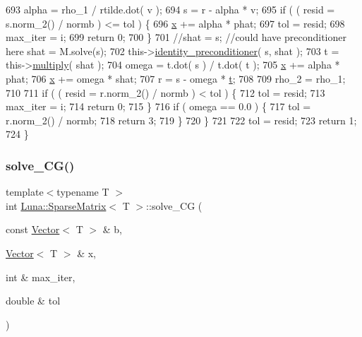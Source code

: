 \begin{DoxyCode}
693       alpha = rho\_1 / rtilde.dot( v );
694       s = r - alpha * v;
695       \textcolor{keywordflow}{if} ( ( resid = s.norm\_2() / normb ) <= tol ) \{
696         \hyperlink{namespaceHeat__plot_aa88370c16b85b784ccbde3ed88bc1991}{x} += alpha * phat;
697         tol = resid;
698         max\_iter = i;
699         \textcolor{keywordflow}{return} 0;
700       \}
701       \textcolor{comment}{//shat = s; //could have preconditioner here shat = M.solve(s);}
702       this->\hyperlink{classLuna_1_1SparseMatrix_ac196d00210b58f3f62352054f4241411}{identity\_preconditioner}( s, shat );
703       t = this->\hyperlink{classLuna_1_1SparseMatrix_a532c8a8b80b0accf950a642344e7954f}{multiply}( shat );
704       omega = t.dot( s ) / t.dot( t );
705       \hyperlink{namespaceHeat__plot_aa88370c16b85b784ccbde3ed88bc1991}{x} += alpha * phat;
706       \hyperlink{namespaceHeat__plot_aa88370c16b85b784ccbde3ed88bc1991}{x} += omega * shat;
707       r = s - omega * \hyperlink{namespaceHeat__plot_a25a93a2226128530145cc611f350163b}{t};
708 
709       rho\_2 = rho\_1;
710 
711       \textcolor{keywordflow}{if} ( ( resid = r.norm\_2() / normb ) < tol ) \{
712         tol = resid;
713         max\_iter = i;
714         \textcolor{keywordflow}{return} 0;
715       \}
716       \textcolor{keywordflow}{if} ( omega == 0.0 ) \{
717         tol = r.norm\_2() / normb;
718         \textcolor{keywordflow}{return} 3;
719       \}
720     \}
721 
722     tol = resid;
723     \textcolor{keywordflow}{return} 1;
724   \}
\end{DoxyCode}
\mbox{\label{classLuna_1_1SparseMatrix_a163219e4a5009de66aa538a6be304249}} 
\subsubsection{\texorpdfstring{solve\+\_\+\+C\+G()}{solve\_CG()}}
{\footnotesize\ttfamily template$<$typename T $>$ \\
int \hyperlink{classLuna_1_1SparseMatrix}{Luna\+::\+Sparse\+Matrix}$<$ T $>$\+::solve\+\_\+\+CG (\begin{DoxyParamCaption}\item[{const \hyperlink{classLuna_1_1Vector}{Vector}$<$ T $>$ \&}]{b,  }\item[{\hyperlink{classLuna_1_1Vector}{Vector}$<$ T $>$ \&}]{x,  }\item[{int \&}]{max\+\_\+iter,  }\item[{double \&}]{tol }\end{DoxyParamCaption})\hspace{0.3cm}{\ttfamily [inline]}}



